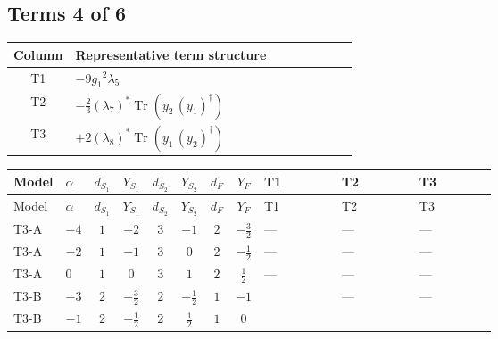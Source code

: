 \documentclass[8pt]{article}
\begin{document}
\begin{landscape}
\subsection*{Terms 4 of 6}
\begin{center}
\begin{tabular}{@{}c >{\raggedright\arraybackslash}p{0.82\linewidth}@{}}
\toprule
Column & Representative term structure \\
\midrule
T1 & \(\displaystyle -9 {g_1}^2 {\lambda_5}\) \\
\midrule
T2 & \(\displaystyle -\frac{2}{3} \left({\lambda_{7}}\right)^{*} \operatorname{Tr}\!\left({y_2}\,\left({y_1}\right)^{\dagger}\right)\) \\
\midrule
T3 & \(\displaystyle +2 \left({\lambda_{8}}\right)^{*} \operatorname{Tr}\!\left({y_1}\,\left({y_2}\right)^{\dagger}\right)\) \\
\midrule
\bottomrule
\end{tabular}
\end{center}
\smallskip
\tiny
\begin{longtable}{@{}llcccccc >{\raggedright\arraybackslash}p{0.21\linewidth} >{\raggedright\arraybackslash}p{0.21\linewidth} >{\raggedright\arraybackslash}p{0.21\linewidth}@{}}
\toprule
Model & $\alpha$ & $d_{S_1}$ & $Y_{S_1}$ & $d_{S_2}$ & $Y_{S_2}$ & $d_F$ & $Y_F$ & T1 & T2 & T3 \\
\midrule
\endfirsthead
\toprule
Model & $\alpha$ & $d_{S_1}$ & $Y_{S_1}$ & $d_{S_2}$ & $Y_{S_2}$ & $d_F$ & $Y_F$ & T1 & T2 & T3 \\
\midrule
\endhead
T3-A & $-4$ & $1$ & $-2$ & $3$ & $-1$ & $2$ & $-\frac{3}{2}$ & --- & --- & --- \\
\midrule
T3-A & $-2$ & $1$ & $-1$ & $3$ & $0$ & $2$ & $-\frac{1}{2}$ & --- & --- & --- \\
\midrule
T3-A & $0$ & $1$ & $0$ & $3$ & $1$ & $2$ & $\frac{1}{2}$ & --- & --- & --- \\
\midrule
T3-B & $-3$ & $2$ & $-\frac{3}{2}$ & $2$ & $-\frac{1}{2}$ & $1$ & $-1$ & \scriptsize\adjustbox{max width=\linewidth}{$\begin{gathered} -9 {g_1}^2 {\lambda_5}\end{gathered}$} & --- & --- \\
\midrule
T3-B & $-1$ & $2$ & $-\frac{1}{2}$ & $2$ & $\frac{1}{2}$ & $1$ & $0$ & \scriptsize\adjustbox{max width=\linewidth}{$\begin{gathered} -3 {g_1}^2 {\lambda_5}\end{gathered}$} & \scriptsize\adjustbox{max width=\linewidth}{$\begin{gathered} -\frac{2}{3} \left({\lambda_{7}}\right)^{*} \operatorname{Tr}\!\left({y_2}\,\left({y_1}\right)^{\dagger}\right)\end{gathered}$} & \scriptsize\adjustbox{max width=\linewidth}{$\begin{gathered} +2 \left({\lambda_{8}}\right)^{*} \operatorname{Tr}\!\left({y_1}\,\left({y_2}\right)^{\dagger}\right)\end{gathered}$} \\

\end{longtable}
\end{landscape}
\end{document}
